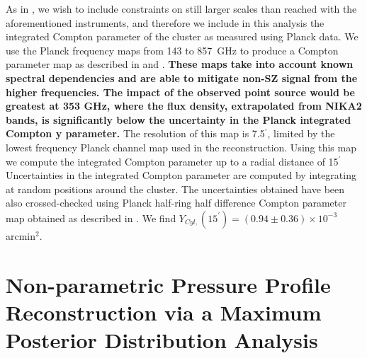 \documentclass[twocolumn,traditabstract]{aa}
\begin{document}
As in \citet{adam2015}, we wish to include constraints on still larger scales than reached with the aforementioned instruments,
and therefore we include in this analysis the integrated Compton parameter of the cluster as measured using Planck data.
We use the Planck frequency maps from 143 to 857~GHz to produce a Compton parameter map as described in \citet{hurier2013} and
\citet{planck2013ymap,planck2016_tsz}. \textbf{These maps take into account known spectral dependencies and are able to mitigate non-SZ
  signal from the higher frequencies. The impact of the observed point source would be greatest at 353 GHz, where the flux density,
  extrapolated from NIKA2 bands, is significantly below the uncertainty in the Planck integrated Compton y parameter.}
The resolution of this map is 7.5$^{\prime}$, limited by the lowest frequency Planck channel
map used in the reconstruction. Using this map we compute the integrated Compton parameter up to a radial distance of 15$^{\prime}$
Uncertainties in the integrated Compton parameter are computed by integrating at random positions
around the cluster. The uncertainties obtained have been also crossed-checked using Planck half-ring half difference Compton parameter
map
obtained as described in \citet{planck2013ymap,planck2016_tsz}. We find $Y_{Cyl,}(15^{\prime}) = (0.94 \pm 0.36) \times 10^{-3}$ arcmin$^2$. 


\section{Non-parametric Pressure Profile Reconstruction via a Maximum Posterior Distribution Analysis}
\label{sec:ml_deproj}

\end{document}
